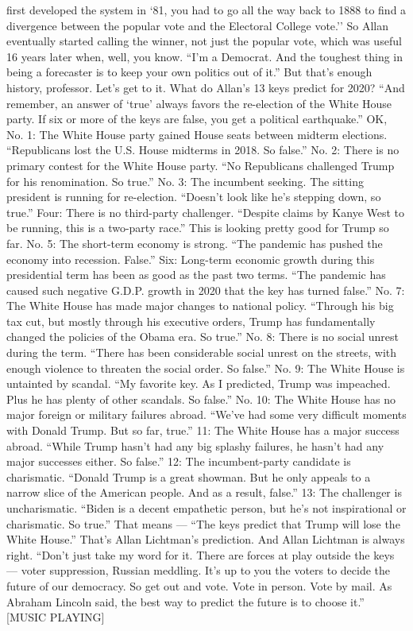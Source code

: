 \begin{itemize}
  first developed the system in `81, you had to go all the way back to
  1888 to find a divergence between the popular vote and the Electoral
  College vote.'' So Allan eventually started calling the winner, not
  just the popular vote, which was useful 16 years later when, well, you
  know. ``I'm a Democrat. And the toughest thing in being a forecaster
  is to keep your own politics out of it.'' But that's enough history,
  professor. Let's get to it. What do Allan's 13 keys predict for 2020?
  ``And remember, an answer of `true' always favors the re-election of
  the White House party. If six or more of the keys are false, you get a
  political earthquake.'' OK, No. 1: The White House party gained House
  seats between midterm elections. ``Republicans lost the U.S. House
  midterms in 2018. So false.'' No. 2: There is no primary contest for
  the White House party. ``No Republicans challenged Trump for his
  renomination. So true.'' No. 3: The incumbent seeking. The sitting
  president is running for re-election. ``Doesn't look like he's
  stepping down, so true.'' Four: There is no third-party challenger.
  ``Despite claims by Kanye West to be running, this is a two-party
  race.'' This is looking pretty good for Trump so far. No. 5: The
  short-term economy is strong. ``The pandemic has pushed the economy
  into recession. False.'' Six: Long-term economic growth during this
  presidential term has been as good as the past two terms. ``The
  pandemic has caused such negative G.D.P. growth in 2020 that the key
  has turned false.'' No. 7: The White House has made major changes to
  national policy. ``Through his big tax cut, but mostly through his
  executive orders, Trump has fundamentally changed the policies of the
  Obama era. So true.'' No. 8: There is no social unrest during the
  term. ``There has been considerable social unrest on the streets, with
  enough violence to threaten the social order. So false.'' No. 9: The
  White House is untainted by scandal. ``My favorite key. As I
  predicted, Trump was impeached. Plus he has plenty of other scandals.
  So false.'' No. 10: The White House has no major foreign or military
  failures abroad. ``We've had some very difficult moments with Donald
  Trump. But so far, true.'' 11: The White House has a major success
  abroad. ``While Trump hasn't had any big splashy failures, he hasn't
  had any major successes either. So false.'' 12: The incumbent-party
  candidate is charismatic. ``Donald Trump is a great showman. But he
  only appeals to a narrow slice of the American people. And as a
  result, false.'' 13: The challenger is uncharismatic. ``Biden is a
  decent empathetic person, but he's not inspirational or charismatic.
  So true.'' That means --- ``The keys predict that Trump will lose the
  White House.'' That's Allan Lichtman's prediction. And Allan Lichtman
  is always right. ``Don't just take my word for it. There are forces at
  play outside the keys --- voter suppression, Russian meddling. It's up
  to you the voters to decide the future of our democracy. So get out
  and vote. Vote in person. Vote by mail. As Abraham Lincoln said, the
  best way to predict the future is to choose it.'' {[}MUSIC PLAYING{]}
\end{itemize}

